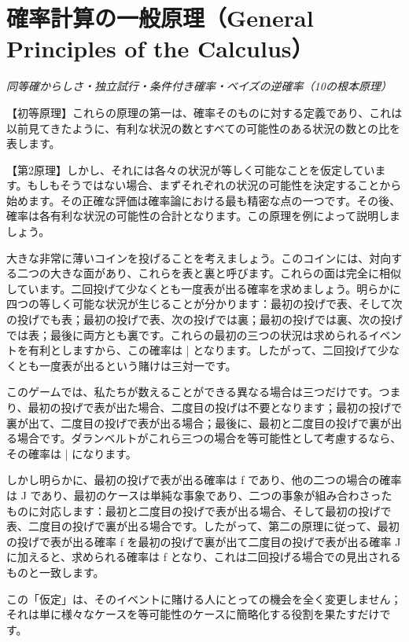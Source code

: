 \documentclass[a4paper,11pt,openany]{ltjsbook}
\begin{document}
\newpage

\chapter{確率計算の一般原理（General Principles of the Calculus）}
\label{ch:iii}

\begin{center}
\large\textit{同等確からしさ・独立試行・条件付き確率・ベイズの逆確率（10の根本原理）}
\end{center}
\vspace{4mm}

【初等原理】これらの原理の第一は、確率そのものに対する定義であり、これは以前見てきたように、有利な状況の数とすべての可能性のある状況の数との比を表します。

【第2原理】しかし、それには各々の状況が等しく可能なことを仮定しています。もしもそうではない場合、まずそれぞれの状況の可能性を決定することから始めます。その正確な評価は確率論における最も精密な点の一つです。その後、確率は各有利な状況の可能性の合計となります。この原理を例によって説明しましょう。

大きな非常に薄いコインを投げることを考えましょう。このコインには、対向する二つの大きな面があり、これらを表と裏と呼びます。これらの面は完全に相似しています。二回投げて少なくとも一度表が出る確率を求めましょう。明らかに四つの等しく可能な状況が生じることが分かります：最初の投げで表、そして次の投げでも表；最初の投げで表、次の投げでは裏；最初の投げでは裏、次の投げでは表；最後に両方とも裏です。これらの最初の三つの状況は求められるイベントを有利としますから、この確率は | となります。したがって、二回投げて少なくとも一度表が出るという賭けは三対一です。

このゲームでは、私たちが数えることができる異なる場合は三つだけです。つまり、最初の投げで表が出た場合、二度目の投げは不要となります；最初の投げで裏が出て、二度目の投げで表が出る場合；最後に、最初と二度目の投げで裏が出る場合です。ダランベルトがこれら三つの場合を等可能性として考慮するなら、その確率は | になります。

しかし明らかに、最初の投げで表が出る確率は f であり、他の二つの場合の確率は J であり、最初のケースは単純な事象であり、二つの事象が組み合わさったものに対応します：最初と二度目の投げで表が出る場合、そして最初の投げで表、二度目の投げで裏が出る場合です。したがって、第二の原理に従って、最初の投げで表が出る確率 f を最初の投げで裏が出て二度目の投げで表が出る確率 J に加えると、求められる確率は f となり、これは二回投げる場合での見出されるものと一致します。

この「仮定」は、そのイベントに賭ける人にとっての機会を全く変更しません；それは単に様々なケースを等可能性のケースに簡略化する役割を果たすだけです。
\end{document}
